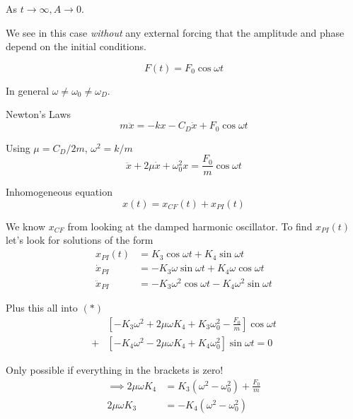 \documentclass[twoside]{scrartcl}
\begin{document}
As $t \to \infty, A \to 0$. 

We see in this case \emph{without} any external forcing that the amplitude and phase depend on the initial conditions.




\begin{center}
\end{center}
\[F(t) = F_0\cos\omega t\]

In general  $\omega \neq \omega_0 \neq \omega_D$. 

Newton's Laws
\[m\ddot{x} = -kx - C_D\dot{x} + F_0\cos\omega t\] 

Using $\mu = C_D/2m$, $\omega^2 = k/m$
\[\ddot{x} + 2\mu\dot{x} + \omega_0^2x = \frac{F_0}{m}\cos\omega t \tag{*}\]

Inhomogeneous equation
\[x(t) = x_{CF}(t) + x_{PI}(t)\]

We know $x_{CF}$ from looking at the damped harmonic oscillator. To find $x_{PI}(t)$ let's look for solutions of the form
\[
\begin{aligned}
  x_{PI}(t) &= K_3\cos\omega t + K_4\sin\omega t\\
  \dot{x}_{PI} &= -K_3\omega\sin\omega t + K_4\omega\cos\omega t\\
  \ddot{x}_{PI} &= -K_3\omega^2\cos\omega t -K_4\omega^2\sin\omega t
\end{aligned}
\]

Plus this all into $(*)$
\[
\begin{aligned}
  &[-K_3\omega^2 + 2\mu\omega K_4 + K_3\omega_0^2 - \frac{F_0}{m}]\cos\omega t\\
  + &[-K_4\omega^2 - 2\mu\omega K_4 + K_4\omega_0^2]\sin\omega t = 0
\end{aligned}
\]

Only possible if everything in the brackets is zero! 
\[
\begin{aligned}
  \implies 2\mu\omega K_4 &= K_3(\omega^2 - \omega_0^2) + \frac{F_0}{m}\\
  2\mu\omega K_3 &= -K_4(\omega^2 - \omega_0^2)
\end{aligned}
\]
\end{document}
